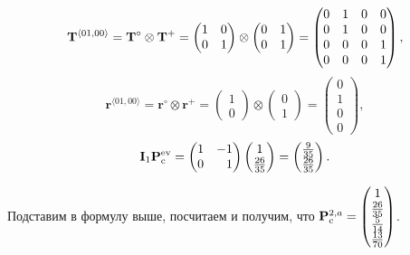 \begin{equation*}
\mathbf{T}^{\langle 01, 00 \rangle} = \mathbf{T}^\circ \otimes \mathbf{T}^+ = 
\begin{pmatrix} 1 &0 \\ 0 & 1\end{pmatrix}  \otimes
\begin{pmatrix} 0 & 1 \\ 0 & 1 \end{pmatrix} =
\begin{pmatrix} 0 &1 & 0 & 0 \\ 0 & 1 & 0 & 0 \\
0 & 0 & 0 & 1\\ 0 & 0 & 0 & 1 \end{pmatrix},
\end{equation*}
\begin{equation*}
\mathbf{r}^{\langle 01, 00 \rangle} = \mathbf{r}^\circ \otimes \mathbf{r}^+ = \begin{pmatrix} 1 \\ 0 \end{pmatrix} \otimes \begin{pmatrix}  0 \\ 1 \end{pmatrix} = \begin{pmatrix}  0 \\ 1 \\ 0 \\ 0 \end{pmatrix},
\end{equation*}
\begin{equation*}
\mathbf{I}_1\Pc^{\ev} = \begin{pmatrix*}[r] 1 & -1 \\ 0 & 1 \end{pmatrix*} \begin{pmatrix}1 \\  \frac{26}{35} \end{pmatrix} = \begin{pmatrix}
\frac{9}{35} \\ \frac{26}{35} \end{pmatrix}.
\end{equation*}

Подставим в формулу выше, посчитаем и получим, что $\mathbf{P}_\mathrm{c}^{2,a} = \begin{pmatrix}
1 \\ \frac{26}{35} \\ \frac{5}{14} \\ \frac{13}{70}
\end{pmatrix}$.
